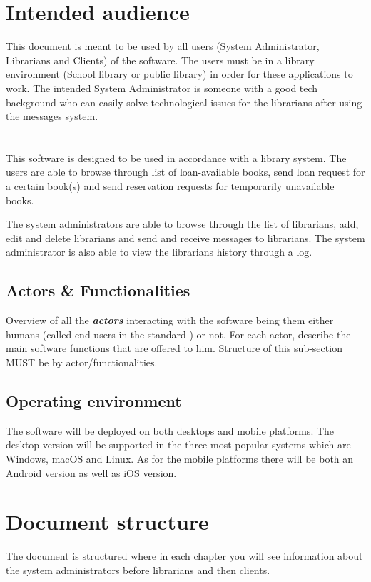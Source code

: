 \section{Intended audience}
This document is meant to be used by all users (System Administrator, Librarians
and Clients) of the \mysystemname software. The users must be in a library
environment (School library or public library) in order for these applications
to work. The intended System Administrator is someone with a good tech
background who can easily solve technological issues for the librarians after
using the messages system. 


\section{\mysystemname}
This software is designed to be used in accordance with a library system.
The users are able to browse through list of loan-available books, send loan
request for a certain book(s) and send reservation requests for temporarily
unavailable books. 


The system administrators are able to browse through the list of librarians,
add, edit and delete librarians and send and receive messages to librarians. The
system administrator is also able to view the librarians history through a log.


\subsection{Actors \& Functionalities}
Overview of all the \textbf{\emph{\glspl{actor}}} interacting with the software
being them either humans (called end-users in the standard
\cite{IEEE-2001-userdocumentation}) or not. For each actor, describe the main
software functions that are offered to him. Structure of this sub-section MUST
be by actor/functionalities.


\subsection{Operating environment}
The software will be deployed on both desktops and mobile platforms. The desktop
version will be supported in the three most popular systems which are Windows,
macOS and Linux. As for the mobile platforms there will be both an Android
version as well as iOS version.

\section{Document structure}

The document is structured where in each chapter you will see information about
the system administrators before librarians and then clients. 







